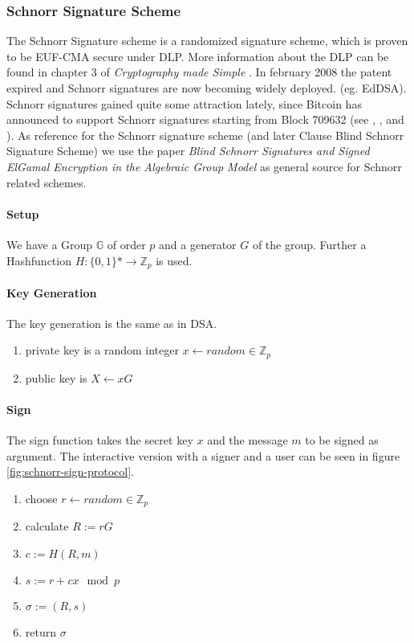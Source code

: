 \subsubsection{Schnorr Signature Scheme}
\label{sec:schnorr-sig}
The Schnorr Signature scheme is a randomized signature scheme, which is proven to be EUF-CMA secure under \ac{DLP}.
More information about the \ac{DLP} can be found in chapter 3 of \textit{Cryptography made Simple} \cite{modernCrypto}.
In february 2008 the patent expired and Schnorr signatures are now becoming widely deployed. (eg. EdDSA).
Schnorr signatures gained quite some attraction lately, since Bitcoin has announced to support Schnorr signatures starting from Block 709632 (see \cite{bip:schnorr-bitc}, \cite{btc:releasnotes-0.21}, and \cite{git:secp256k1-schnorr}).
As reference for the Schnorr signature scheme (and later Clause Blind Schnorr Signature Scheme) we use the paper \textit{Blind Schnorr Signatures and Signed ElGamal Encryption in the Algebraic Group Model} \cite{cryptoeprint:2019:877} as general source for Schnorr related schemes.

\paragraph{Setup}
We have a Group $\mathbb{G}$ of order $p$ and a generator $G$ of the group.
Further a Hashfunction $H: \{0,1\}* \rightarrow \mathbb{Z}_p$ is used.

\paragraph{Key Generation}
The key generation is the same as in \ac{DSA}.
\begin{enumerate}
    \item private key is a random integer $x \leftarrow random \in \mathbb{Z}_p$
    \item public key is $X \leftarrow xG$
\end{enumerate}

\paragraph{Sign}
The sign function takes the secret key $x$ and the message $m$ to be signed as argument.
The interactive version with a signer and a user can be seen in figure \ref{fig:schnorr-sign-protocol}.
\begin{enumerate}
    \item choose $r \leftarrow random \in \mathbb{Z}_p $
    \item calculate $R := rG$
    \item $ c := H(R,m)$
    \item $s := r + cx \mod p$
    \item $\sigma := (R,s)$
    \item return $\sigma$
\end{enumerate}

